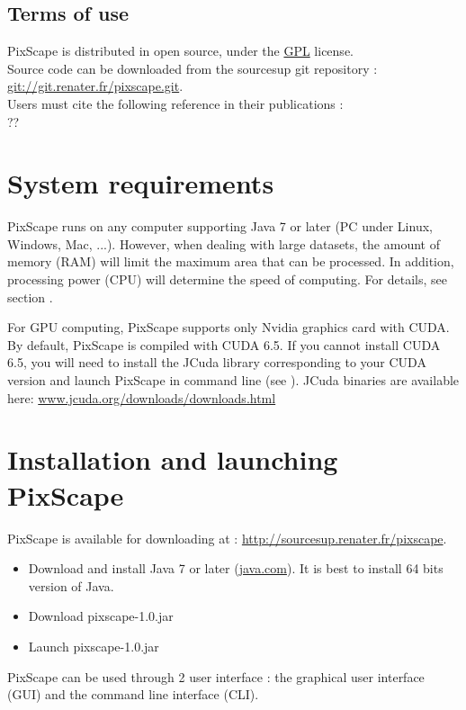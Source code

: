 \documentclass{report}
\begin{document}
\subsection{Terms of use}
PixScape is distributed in open source, under the \href{https://www.gnu.org/licenses/gpl-3.0.html}{GPL} license.\\
Source code can be downloaded from the sourcesup git repository : \url{git://git.renater.fr/pixscape.git}.\\
Users must cite the following reference in their publications :\\
??


\section{System requirements}

PixScape runs on any computer supporting Java 7 or later (PC under Linux, Windows, Mac, ...). 
However, when dealing with large datasets, the amount of memory (RAM) will limit the maximum area that can be processed. In addition, processing power (CPU) will determine the speed of computing. For details, see section .

For GPU computing, PixScape supports only Nvidia graphics card with CUDA. By default, PixScape is compiled with CUDA 6.5. If you cannot install CUDA 6.5, you will need to install the JCuda library corresponding to your CUDA version and launch PixScape in command line (see ). JCuda binaries are available here: \href{http://www.jcuda.org/downloads/downloads.html}{www.jcuda.org/downloads/downloads.html}

\section{Installation and launching PixScape}

PixScape is available for downloading at : \url{http://sourcesup.renater.fr/pixscape}.

\begin{itemize}
	\item Download and install Java 7 or later (\href{http://www.java.com}{java.com}). It is best to install 64 bits version of Java.
	\item Download pixscape-1.0.jar
	\item Launch pixscape-1.0.jar
\end{itemize}

PixScape can be used through 2 user interface : the graphical user interface (GUI) and the command line interface (CLI).
\end{document}
